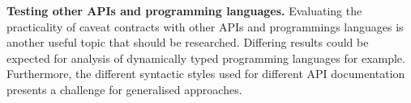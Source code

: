\noindent
\textbf{Testing other APIs and programming languages.} Evaluating the practicality of caveat contracts with other APIs and programmings languages is another useful topic that should be researched. Differing results could be expected for analysis of dynamically typed programming languages for example. Furthermore, the different syntactic styles used for different API documentation presents a challenge for generalised approaches.